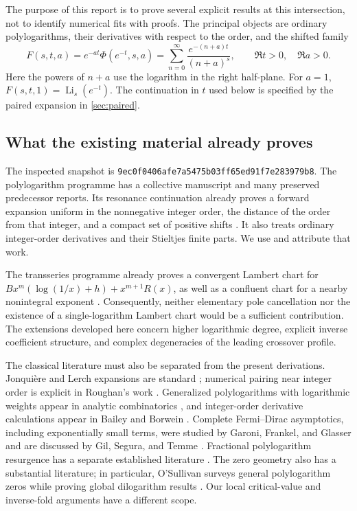 \documentclass[11pt,a4paper]{article}
\numberwithin{equation}{section}
\theoremstyle{definition}
\theoremstyle{remark}
\DeclareMathOperator{\Li}{Li}
\newcommand{\snapshot}{\texttt{9ec0f0406afe7a5475b03ff65ed91f7e283979b8}}
\begin{document}
The purpose of this report is to prove several explicit results at this
intersection, not to identify numerical fits with proofs. The principal
objects are ordinary polylogarithms, their derivatives with respect to
the order, and the shifted family
\begin{equation}\label{eq:Fshift}
 F(s,t,a)=e^{-at}\Phi(e^{-t},s,a)
 =\sum_{n=0}^{\infty}\frac{e^{-(n+a)t}}{(n+a)^s},
 \qquad \Re t>0,\quad \Re a>0.
\end{equation}
Here the powers of $n+a$ use the logarithm in the right half-plane.
For $a=1$, $F(s,t,1)=\Li_s(e^{-t})$. The continuation in $t$ used below
is specified by the paired expansion in \cref{sec:paired}.

\subsection{What the existing material already proves}

The inspected snapshot is \snapshot. The polylogarithm programme has a
collective manuscript and many preserved predecessor reports. Its
resonance continuation already proves a forward expansion uniform in
the nonnegative integer order, the distance of the order from that
integer, and a compact set of positive shifts \cite{repo-resonance}.
It also treats ordinary integer-order derivatives and their Stieltjes
finite parts. We use and attribute that work.

The transseries programme already proves a convergent Lambert chart for
$Bx^m(\log(1/x)+h)+x^{m+1}R(x)$, as well as a confluent chart for a
nearby nonintegral exponent \cite{repo-lambert,repo-confluent}.
Consequently, neither elementary pole cancellation nor the existence
of a single-logarithm Lambert chart would be a sufficient contribution.
The extensions developed here concern higher logarithmic degree,
explicit inverse coefficient structure, and complex degeneracies of
the leading crossover profile.

The classical literature must also be separated from the present
derivations. Jonqui\`ere and Lerch expansions are standard
\cite{dlmf-poly,dlmf-lerch}; numerical pairing near integer order is
explicit in Roughan's work \cite{roughan}. Generalized polylogarithms
with logarithmic weights appear in analytic combinatorics
\cite{flajolet-sedgewick}, and integer-order derivative calculations
appear in Bailey and Borwein \cite{bailey-borwein}. Complete
Fermi--Dirac asymptotics, including exponentially small terms, were
studied by Garoni, Frankel, and Glasser and are discussed by Gil,
Segura, and Temme \cite{garoni,gil}. Fractional polylogarithm
resurgence has a separate established literature \cite{costin}.
The zero geometry also has a substantial literature; in particular,
O'Sullivan surveys general polylogarithm zeros while proving global
dilogarithm results \cite{osullivan}. Our local critical-value and
inverse-fold arguments have a different scope.
\end{document}
